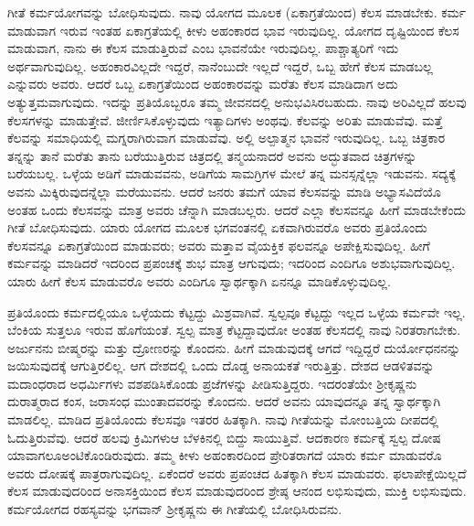 ಗೀತೆ ಕರ್ಮಯೋಗವನ್ನು ಬೋಧಿಸುವುದು. ನಾವು ಯೋಗದ ಮೂಲಕ (ಏಕಾಗ್ರತೆಯಿಂದ) ಕೆಲಸ ಮಾಡಬೇಕು. ಕರ್ಮ ಮಾಡುವಾಗ ಇರುವ ಇಂತಹ ಏಕಾಗ್ರತೆಯಲ್ಲಿ ಕೀಳು ಅಹಂಕಾರದ ಭಾವ ಇರುವುದಿಲ್ಲ. ಯೋಗದ ದೃಷ್ಟಿಯಿಂದ ಕೆಲಸ ಮಾಡುವಾಗ, ನಾನು ಈ ಕೆಲಸ ಮಾಡುತ್ತಿರುವೆ ಎಂಬ ಭಾವನೆಯೇ ಇರುವುದಿಲ್ಲ. ಪಾಶ್ಚಾತ್ಯರಿಗೆ ಇದು ಅರ್ಥವಾಗುವುದಿಲ್ಲ. ಅಹಂಕಾರವಿಲ್ಲದೇ ಇದ್ದರೆ, ನಾನೆಂಬುದೇ ಇಲ್ಲದೆ ಇದ್ದರೆ, ಒಬ್ಬ ಹೇಗೆ ಕೆಲಸ ಮಾಡಬಲ್ಲ ಎನ್ನುವರು ಅವರು. ಆದರೆ ಒಬ್ಬ ಏಕಾಗ್ರತೆಯಿಂದ ಅಹಂಕಾರವನ್ನು ಮರೆತು ಕೆಲಸ ಮಾಡಿದಾಗ ಅದು ಅತ್ಯುತ್ತಮವಾಗುವುದು. ಇದನ್ನು ಪ್ರತಿಯೊಬ್ಬರೂ ತಮ್ಮ ಜೀವನದಲ್ಲಿ ಅನುಭವಿಸಿರಬಹುದು. ನಾವು ಅರಿವಿಲ್ಲದೆ ಹಲವು ಕೆಲಸಗಳನ್ನು ಮಾಡುತ್ತೇವೆ. ಜೀರ್ಣಿಸಿಕೊಳ್ಳುವುದು ಇತ್ಯಾದಿಗಳು ಅಂಥವು. ಕೆಲವನ್ನು ಅರಿತು ಮಾಡುವೆವು. ಮತ್ತೆ ಕೆಲವನ್ನು ಸಮಾಧಿಯಲ್ಲಿ ಮಗ್ನರಾಗಿರುವಾಗ ಮಾಡುವೆವು. ಅಲ್ಲಿ ಅಲ್ಪಾತ್ಮನ ಭಾವನೆ ಇರುವುದಿಲ್ಲ. ಒಬ್ಬ ಚಿತ್ರಕಾರ ತನ್ನನ್ನು ತಾನೆ ಮರೆತು ತಾನು ಬರೆಯುತ್ತಿರುವ ಚಿತ್ರದಲ್ಲಿ ತನ್ಮಯನಾದರೆ ಅವನು ಅದ್ಭುತವಾದ ಚಿತ್ರಗಳನ್ನು ಬರೆಯಬಲ್ಲ. ಒಳ್ಳೆಯ ಅಡಿಗೆ ಮಾಡುವವನು, ಅಡಿಗೆಯ ಸಾಮಗ್ರಿಗಳ ಮೇಲೆ ತನ್ನ ಮನಸ್ಸನ್ನೆಲ್ಲಾ ಇಡುವನು. ಸದ್ಯಕ್ಕೆ ಅವನು ಮಿಕ್ಕಿರುವುದನ್ನೆಲ್ಲಾ ಮರೆಯುವನು. ಆದರೆ ಜನರು ತಮಗೆ ಯಾವ ಕೆಲಸವನ್ನು ಮಾಡಿ ಅಭ್ಯಾಸವಿದೆಯೊ ಅಂತಹ ಒಂದು ಕೆಲಸವನ್ನು ಮಾತ್ರ ಅವರು ಚೆನ್ನಾಗಿ ಮಾಡಬಲ್ಲರು. ಆದರೆ ಎಲ್ಲಾ ಕೆಲಸವನ್ನೂ ಹೀಗೆ ಮಾಡಬೇಕೆಂದು ಗೀತೆ ಬೋಧಿಸುವುದು. ಯಾರು ಯೋಗದ ಮೂಲಕ ಭಗವಂತನಲ್ಲಿ ಏಕವಾಗಿರುವರೊ ಅವರು ಪ್ರತಿಯೊಂದು ಕೆಲಸವನ್ನೂ ಏಕಾಗ್ರತೆಯಿಂದ ಮಾಡುವರು; ಅವರು ಮತ್ತಾವ ವೈಯಕ್ತಿಕ ಫಲವನ್ನೂ ಅಪೇಕ್ಷಿಸುವುದಿಲ್ಲ. ಹೀಗೆ ಕರ್ಮವನ್ನು ಮಾಡಿದರೆ ಇದರಿಂದ ಪ್ರಪಂಚಕ್ಕೆ ಶುಭ ಮಾತ್ರ ಆಗುವುದು; ಇದರಿಂದ ಎಂದಿಗೂ ಅಶುಭವಾಗುವುದಿಲ್ಲ. ಯಾರು ಹೀಗೆ ಕೆಲಸ ಮಾಡುವರೊ ಅವರು ಎಂದಿಗೂ ಸ್ವಾರ್ಥಕ್ಕಾಗಿ ಏನನ್ನೂ ಮಾಡಿಕೊಳ್ಳುವುದಿಲ್ಲ.

ಪ್ರತಿಯೊಂದು ಕರ್ಮದಲ್ಲಿಯೂ ಒಳ್ಳೆಯದು ಕೆಟ್ಟದ್ದು ಮಿಶ್ರವಾಗಿವೆ. ಸ್ವಲ್ಪವೂ ಕೆಟ್ಟದ್ದು ಇಲ್ಲದ ಒಳ್ಳೆಯ ಕರ್ಮವೇ ಇಲ್ಲ. ಬೆಂಕಿಯ ಸುತ್ತಲೂ ಇರುವ ಹೊಗೆಯಂತೆ. ಸ್ವಲ್ಪ ಮಾತ್ರ ಕೆಟ್ಟದ್ದಾವುದೋ ಅಂತಹ ಕೆಲಸದಲ್ಲಿ ನಾವು ನಿರತರಾಗಬೇಕು. ಅರ್ಜುನನು ಬೀಷ್ಮರನ್ನು ಮತ್ತು ದ್ರೋಣರನ್ನು ಕೊಂದನು. ಹೀಗೆ ಮಾಡುವುದಕ್ಕೆ ಆಗದೆ ಇದ್ದಿದ್ದರೆ ದುರ್ಯೋಧನನನ್ನು ಜಯಿಸುವುದಕ್ಕೆ ಆಗುತ್ತಿರಲಿಲ್ಲ. ಆಗ ದೇಶದಲ್ಲಿ ಒಂದು ದೊಡ್ಡ ಅನಾಯಕತೆ ಇರುತ್ತಿತ್ತು. ದೇಶದ ಆಡಳಿತವನ್ನು ಮದಾಂಧರಾದ ಅಧರ್ಮಿಗಳು ವಶಪಡಿಸಿಕೊಂಡು ಪ್ರಜೆಗಳನ್ನು ಪೀಡಿಸುತ್ತಿದ್ದರು. ಇದರಂತೆಯೇ ಶ‍್ರೀಕೃಷ್ಣನು ದುರಾತ್ಮರಾದ ಕಂಸ, ಜರಾಸಂಧ ಮುಂತಾದವರನ್ನು ಕೊಂದನು. ಆದರೆ ಅವನು ಯಾವುದನ್ನೂ ತನ್ನ ಸ್ವಾರ್ಥಕ್ಕಾಗಿ ಮಾಡಲಿಲ್ಲ. ಮಾಡಿದ ಪ್ರತಿಯೊಂದು ಕೆಲಸವೂ ಇತರರ ಹಿತಕ್ಕಾಗಿ. ನಾವು ಗೀತೆಯನ್ನು ಮೋಂಬತ್ತಿಯ ದೀಪದಲ್ಲಿ ಓದುತ್ತಿರುವೆವು. ಆದರೆ ಹಲವು ಕ್ರಿಮಿಗಳು\break ಆ ಬೆಳಕಿನಲ್ಲಿ ಬಿದ್ದು ಸಾಯುತ್ತಿವೆ. ಆದಕಾರಣ ಕರ್ಮಕ್ಕೆ ಸ್ವಲ್ಪ ದೋಷ ಯಾವಾಗಲೂ\break ಅಂಟಿಕೊಂಡಿರುವುದು. ತಮ್ಮ ಕೀಳು ಅಹಂಕಾರದಿಂದ ಪ್ರೇರಿತರಾಗದೆ ಯಾರು ಕರ್ಮ ಮಾಡುವರೊ ಅವರು ದೋಷಕ್ಕೆ ಪಾತ್ರರಾಗುವುದಿಲ್ಲ. ಏಕೆಂದರೆ ಅವರು ಪ್ರಪಂಚದ ಹಿತಕ್ಕಾಗಿ ಕೆಲಸ ಮಾಡುವರು. ಫಲಾಪೇಕ್ಷೆಯಿಲ್ಲದೆ ಕೆಲಸ ಮಾಡುವುದರಿಂದ ಅನಾಸಕ್ತಿಯಿಂದ ಕೆಲಸ ಮಾಡುವುದರಿಂದ ಶ್ರೇಷ್ಠ ಆನಂದ ಲಭಿಸುವುದು, ಮುಕ್ತಿ ಲಭಿಸುವುದು. ಕರ್ಮಯೋಗದ ರಹಸ್ಯವನ್ನು ಭಗವಾನ್​ ಶ‍್ರೀಕೃಷ್ಣನು ಈ ಗೀತೆಯಲ್ಲಿ ಬೋಧಿಸಿರುವನು.

\vskip -0.5cm

